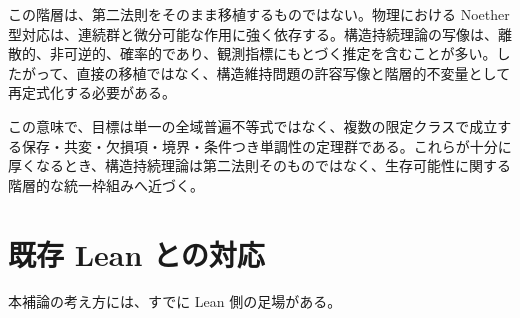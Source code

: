 \documentclass[12pt,a4paper]{article}
\begin{document}
この階層は、第二法則をそのまま移植するものではない。物理における Noether 型対応は、連続群と微分可能な作用に強く依存する。構造持続理論の写像は、離散的、非可逆的、確率的であり、観測指標にもとづく推定を含むことが多い。したがって、直接の移植ではなく、構造維持問題の許容写像と階層的不変量として再定式化する必要がある。

この意味で、目標は単一の全域普遍不等式ではなく、複数の限定クラスで成立する保存・共変・欠損項・境界・条件つき単調性の定理群である。これらが十分に厚くなるとき、構造持続理論は第二法則そのものではなく、生存可能性に関する階層的な統一枠組みへ近づく。

\section{既存 Lean との対応}\label{ux65e2ux5b58-lean-ux3068ux306eux5bfeux5fdc}

本補論の考え方には、すでに Lean 側の足場がある。
\end{document}
